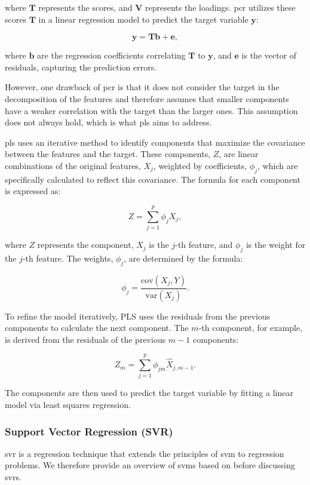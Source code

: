 where $\mathbf{T}$ represents the scores, and $\mathbf{V}$ represents the loadings.
\gls{pcr} utilizes these scores $\mathbf{T}$ in a linear regression model to predict the target variable $\mathbf{y}$:

$$
\mathbf{y} = \mathbf{Tb} + \mathbf{e},
$$

where $\mathbf{b}$ are the regression coefficients correlating $\mathbf{T}$ to $\mathbf{y}$, and $\mathbf{e}$ is the vector of residuals, capturing the prediction errors.

However, one drawback of \gls{pcr} is that it does not consider the target in the decomposition of the features and therefore assumes that smaller components have a weaker correlation with the target than the larger ones.
This assumption does not always hold, which is what \gls{pls} aims to address.

\gls{pls} uses an iterative method to identify components that maximize the covariance between the features and the target.
These components, $Z$, are linear combinations of the original features, $X_j$, weighted by coefficients, $\phi_j$, which are specifically calculated to reflect this covariance.
The formula for each component is expressed as:

$$
    Z = \sum_{j=1}^{p} \phi_j X_j,
$$

where $Z$ represents the component, $X_j$ is the $j$-th feature, and $\phi_j$ is the weight for the $j$-th feature.
The weights, $\phi_j$, are determined by the formula:

$$
    \phi_j = \frac{\text{cov}(X_j, Y)}{\text{var}(X_j)}.
$$

To refine the model iteratively, PLS uses the residuals from the previous components to calculate the next component.
The $m$-th component, for example, is derived from the residuals of the previous $m-1$ components:

$$
    Z_m = \sum_{j=1}^{p} \phi_{jm} \hat{X}_{j, m-1}.
$$

The components are then used to predict the target variable by fitting a linear model via least squares regression.

\subsubsection{Support Vector Regression (SVR)}
\gls{svr} is a regression technique that extends the principles of \gls{svm} to regression problems.
We therefore provide an overview of \gls{svm}s based on \citet{James2023AnIS} before discussing \gls{svr}s.

